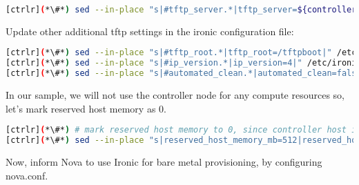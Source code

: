 
\begin{lstlisting}[language=bash,keywords={}]
[ctrlr](*\#*) sed --in-place "s|#tftp_server.*|tftp_server=${controller_ip}|" /etc/ironic/ironic.conf
\end{lstlisting} 

	Update other additional tftp settings in the ironic configuration file:


\begin{lstlisting}[language=bash,keywords={}]
[ctrlr](*\#*) sed --in-place "s|#tftp_root.*|tftp_root=/tftpboot|" /etc/ironic/ironic.conf
[ctrlr](*\#*) sed --in-place "s|#ip_version.*|ip_version=4|" /etc/ironic/ironic.conf
[ctrlr](*\#*) sed --in-place "s|#automated_clean.*|automated_clean=false|" /etc/ironic/ironic.conf
\end{lstlisting} 
	In our sample, we will not use the controller node for any compute resources so, let's mark reserved host memory as 0.


\begin{lstlisting}[language=bash,keywords={}]
[ctrlr](*\#*) # mark reserved host memory to 0, since controller host is not used for compute
[ctrlr](*\#*) sed --in-place "s|reserved_host_memory_mb=512|reserved_host_memory_mb=0|" /etc/nova/nova.conf
\end{lstlisting} 
	Now, inform Nova to use Ironic for bare metal provisioning, by configuring nova.conf.


